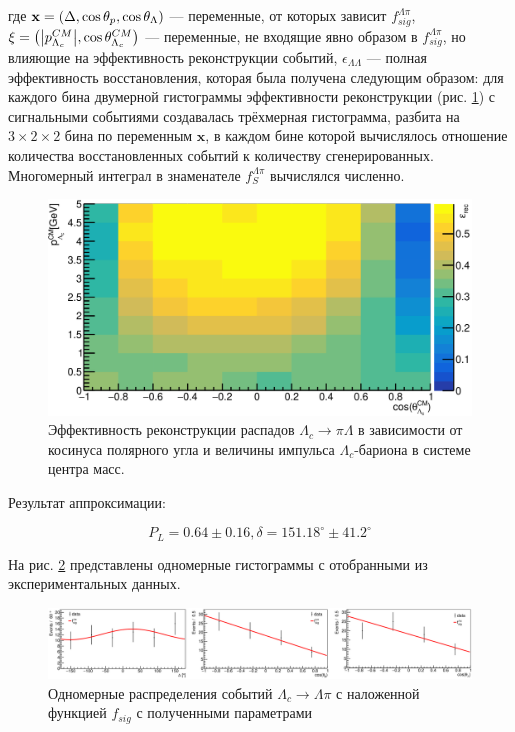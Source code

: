 где $\mathbf{x} = \left( \Delta, \cos \theta_p, \cos \theta_\Lambda  \right)$ --- переменные, 
от которых зависит $f^{\Lambda\pi}_{sig} $, $\xi = \left(  \abs{ p^{CM}_{\Lambda_c}}, \cos \theta^{CM}_{\Lambda_c}  \right)$ 
--- переменные, не входящие явно образом в $ f^{\Lambda\pi}_{sig}$, 
но влияющие на эффективность реконструкции событий, $ \epsilon_{\Lambda\Lambda} $ 
--- полная эффективность восстановления, которая была получена следующим образом: 
для каждого бина двумерной гистограммы эффективности реконструкции (рис. \ref{l_pi:rec}) 
с сигнальными событиями создавалась трёхмерная гистограмма, разбита на 
$ 3 \times 2 \times 2 $ бина по переменным $ \mathbf{x} $, 
в каждом бине которой вычислялось отношение количества восстановленных событий 
к количеству сгенерированных. Многомерный интеграл в знаменателе 
$ f^{\Lambda\pi}_{S} $ вычислялся численно.

\begin{figure}[H]
    \centering
    \includegraphics[width=1\linewidth]{img/l_pi_rec.png}
    \caption{Эффективность реконструкции распадов $\Lambda_c \to \pi \Lambda$ в зависимости от
    косинуса полярного угла и величины импульса $\Lambda_c$-бариона в системе центра масс.}
    \label{l_pi:rec}
\end{figure}


Результат аппроксимации:

\begin{equation}
    P_L = 0.64\pm 0.16, \delta = 151.18^\circ \pm 41.2^\circ
\end{equation}

На рис. \ref{l_pi:fit} представлены одномерные гистограммы с отобранными из экспериментальных данных.

\begin{figure}[H]
    \centering
    \includegraphics[width=1\linewidth]{img/l_pi_fit.png}
    \caption{Одномерные распределения событий $\Lambda_c \to \Lambda \pi$ с наложенной
    функцией $f_{sig}$ с полученными параметрами}
    \label{l_pi:fit}
\end{figure}


